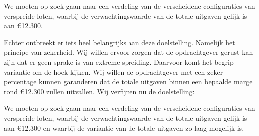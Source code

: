 \begin{adjustwidth}{1.5cm}{1.5cm}
We moeten op zoek gaan naar een verdeling van de verscheidene configuraties van verspreide loten, waarbij de verwachtingswaarde van de totale uitgaven gelijk is aan \euro12.300.\\
\end{adjustwidth}

Echter ontbreekt er iets heel belangrijks aan deze doelstelling. Namelijk het principe van zekerheid. Wij willen ervoor zorgen dat de opdrachtgever gerust kan zijn dat er geen sprake is van extreme spreiding. Daarvoor komt het begrip variantie om de hoek kijken. Wij willen de opdrachtgever met een zeker percentage kunnen garanderen dat de totale uitgaven binnen een bepaalde marge rond \euro12.300 zullen uitvallen. Wij verfijnen nu de doelstelling:\\

\begin{adjustwidth}{1.5cm}{1.5cm}
We moeten op zoek gaan naar een verdeling van de verscheidene configuraties van verspreide loten, waarbij de verwachtingswaarde van de totale uitgaven gelijk is aan \euro12.300 en waarbij de variantie van de totale uitgaven zo laag mogelijk is.
\end{adjustwidth}

 

